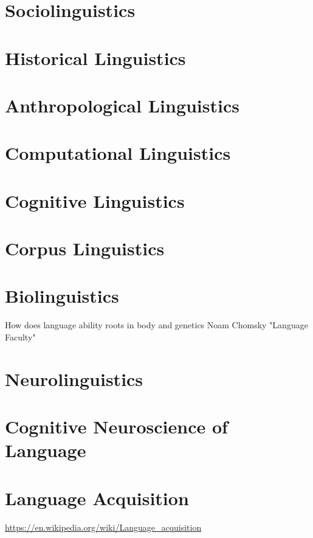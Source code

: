     \section{Sociolinguistics}
    \section{Historical Linguistics}
    \section{Anthropological Linguistics}
    \section{Computational Linguistics}
    \section{Cognitive Linguistics}
    \section{Corpus Linguistics}
    \section{Biolinguistics}
        How does language ability roots in body and genetics
        Noam Chomsky "Language Faculty"
    \section{Neurolinguistics}
    \section{Cognitive Neuroscience of Language}
    \section{Language Acquisition}
        \url{https://en.wikipedia.org/wiki/Language_acquisition}
    




\listoftodos

